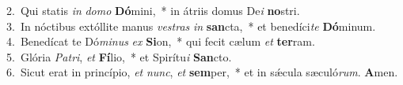 {2.~}Qui statis \textit{in} \textit{do}\textit{mo} \textbf{Dó}mini,~* in átriis domus De\textit{i} \textbf{no}stri.\\
{3.~}In nóctibus extóllite manus \textit{ve}\textit{stras} \textit{in} \textbf{san}cta,~* et benedíci\textit{te} \textbf{Dó}minum.\\
{4.~}Benedícat te Dó\textit{mi}\textit{nus} \textit{ex} \textbf{Si}on,~* qui fecit cælum \textit{et} \textbf{ter}ram.\\
{5.~}Glória \textit{Pa}\textit{tri}, \textit{et} \textbf{Fí}lio,~* et Spirítu\textit{i} \textbf{San}cto.\\
{6.~}Sicut erat in princípio, \textit{et} \textit{nunc}, \textit{et} \textbf{sem}per,~* et in sǽcula sæculó\textit{rum}. \textbf{A}men.\\

